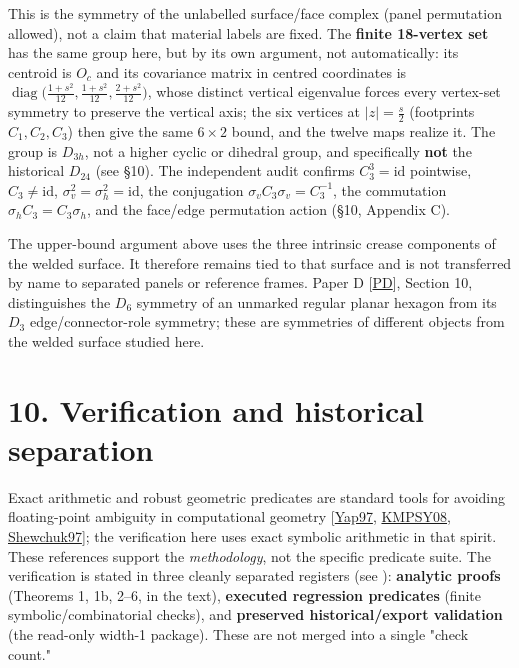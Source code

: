 \documentclass[
  11pt,
  a4paper,
]{article}
\begin{document}
This is the symmetry of the unlabelled surface/face complex (panel permutation allowed), not a claim that material labels are fixed. The \textbf{finite 18-vertex set} has the same group here, but by its own argument, not automatically: its centroid is \(O_c\) and its covariance matrix in centred coordinates is \(\operatorname{diag}\bigl(\tfrac{1+s^2}{12},\tfrac{1+s^2}{12},\tfrac{2+s^2}{12}\bigr)\), whose distinct vertical eigenvalue forces every vertex-set symmetry to preserve the vertical axis; the six vertices at \(|z|=\tfrac{s}{2}\) (footprints \(C_1,C_2,C_3\)) then give the same \(6\times2\) bound, and the twelve maps realize it. The group is \(D_{3h}\), not a higher cyclic or dihedral group, and specifically \textbf{not} the historical \(D_{24}\) (see §10). The independent audit confirms \(C_3^3=\mathrm{id}\) pointwise, \(C_3\ne\mathrm{id}\), \(\sigma_v^2=\sigma_h^2=\mathrm{id}\), the conjugation \(\sigma_vC_3\sigma_v=C_3^{-1}\), the commutation \(\sigma_hC_3=C_3\sigma_h\), and the face/edge permutation action (§10, Appendix C).

The upper-bound argument above uses the three intrinsic crease components of the welded surface. It therefore remains tied to that surface and is not transferred by name to separated panels or reference frames. Paper D {[}\hyperlink{ref-PD}{PD}{]}, Section 10, distinguishes the \(D_6\) symmetry of an unmarked regular planar hexagon from its \(D_3\) edge/connector-role symmetry; these are symmetries of different objects from the welded surface studied here.

\section{10. Verification and historical separation}\label{verification-and-historical-separation}

Exact arithmetic and robust geometric predicates are standard tools for avoiding floating-point ambiguity in computational geometry {[}\hyperlink{ref-Yap97}{Yap97}, \hyperlink{ref-KMPSY08}{KMPSY08}, \hyperlink{ref-Shewchuk97}{Shewchuk97}{]}; the verification here uses exact symbolic arithmetic in that spirit. These references support the \emph{methodology}, not the specific predicate suite. The verification is stated in three cleanly separated registers (see ): \textbf{analytic proofs} (Theorems 1, 1b, 2--6, in the text), \textbf{executed regression predicates} (finite symbolic/combinatorial checks), and \textbf{preserved historical/export validation} (the read-only width-1 package). These are not merged into a single "check count."
\end{document}
